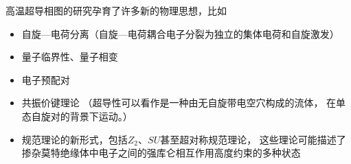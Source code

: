 \documentclass{article}
\begin{document}
 高温超导相图的研究孕育了许多新的物理思想，比如
 \begin{itemize}
     \item 自旋---电荷分离（自旋---电荷耦合电子分裂为独立的集体电荷和自旋激发）
     \item 量子临界性、量子相变
     \item 电子预配对
     \item 共振价键理论
     （超导性可以看作是一种由无自旋带电空穴构成的流体，
     在单态自旋对的背景下运动。）
     \item 规范理论的新形式，包括$Z_2$、$SU$甚至超对称规范理论，
     这些理论可能描述了掺杂莫特绝缘体中电子之间的强库仑相互作用高度约束的多种状态
 \end{itemize}
\end{document}

